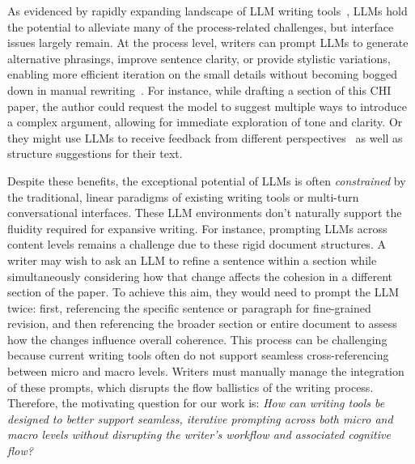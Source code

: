 As evidenced by rapidly expanding landscape of LLM writing tools~\cite{Lee2024design}, LLMs hold the potential to alleviate many of the process-related challenges, but interface issues largely remain. At the process level, writers can prompt LLMs to generate alternative phrasings, improve sentence clarity, or provide stylistic variations, enabling more efficient iteration on the small details without becoming bogged down in manual rewriting~\cite{reza2023abscribe}. For instance, while drafting a section of this CHI paper, the author could request the model to suggest multiple ways to introduce a complex argument, allowing for immediate exploration of tone and clarity. Or they might use LLMs to receive feedback from different perspectives~\cite{benharrak2024writer} as well as structure suggestions for their text.

Despite these benefits, the exceptional potential of LLMs is often \textit{constrained} by the traditional, linear paradigms of existing writing tools or multi-turn conversational interfaces. These LLM environments don't naturally support the fluidity required for expansive writing. For instance, prompting LLMs across content levels remains a challenge due to these rigid document structures. A writer may wish to ask an LLM to refine a sentence within a section while simultaneously considering how that change affects the cohesion in a different section of the paper. To achieve this aim, they would need to prompt the LLM twice: first, referencing the specific sentence or paragraph for fine-grained revision, and then referencing the broader section or entire document to assess how the changes influence overall coherence. This process can be challenging because current writing tools often do not support seamless cross-referencing between micro and macro levels. Writers must manually manage the integration of these prompts, which disrupts the flow ballistics of the writing process. Therefore, the motivating question for our work is: \textit{How can writing tools be designed to better support seamless, iterative prompting across both micro and macro levels without disrupting the writer's workflow and associated cognitive flow? }

